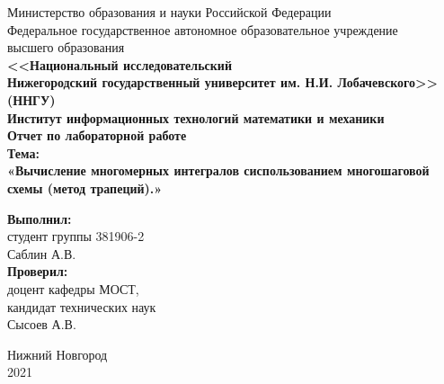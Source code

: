 \documentclass{report}
\begin{document}
\begin{titlepage}

    \begin{center}
    Министерство образования и науки Российской Федерации\\
    Федеральное государственное автономное образовательное учреждение  \\
    высшего образования\\
    \textbf{<<Национальный исследовательский\\Нижегородский государственный университет им. Н.И. Лобачевского>>}\\
    \textbf{(ННГУ)}\\[0.5cm]%
    \textbf{Институт информационных технологий математики и механики}\\[0.5cm]
    \textbf{\large Отчет по лабораторной работе} \\[0.6cm] %
    \textbf{Тема:}\\
    \textbf{\large «Вычисление многомерных интегралов сиспользованием многошаговой схемы (метод трапеций).»}\\[2.5cm]

    \vspace{4em}

    \begin{flushright}
    \begin{minipage}{0.55\textwidth}
    \begin{flushleft}
        \textbf{Выполнил:} \\
        студент группы 381906-2\\
        Саблин А.В.\\
        \textbf{Проверил:}\\ доцент кафедры МОСТ, \\ кандидат технических наук \\ Сысоев А.В.\\
    \end{flushleft}
    \end{minipage}
    \end{flushright}
    
    \vfill
 
    Нижний Новгород \\ 2021

\end{center}
\end{titlepage}

\setcounter{page}{2}

\tableofcontents
\newpage
\end{document}
